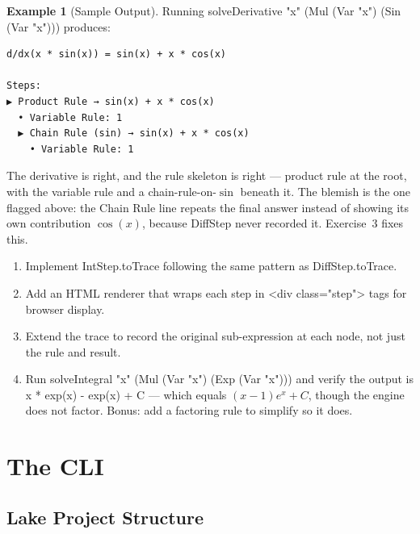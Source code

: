 \documentclass[12pt, openany]{book}
\theoremstyle{plain}
\theoremstyle{definition}
\newtheorem{example}[theorem]{Example}
\theoremstyle{remark}
\newcommand{\li}[1]{{\ttfamily\small\color{tealaccent}#1}}
\begin{document}
\begin{example}[Sample Output]
Running \li{solveDerivative "x" (Mul (Var "x") (Sin (Var "x")))} produces:

\begin{verbatim}
d/dx(x * sin(x)) = sin(x) + x * cos(x)

Steps:
▶ Product Rule → sin(x) + x * cos(x)
  • Variable Rule: 1
  ▶ Chain Rule (sin) → sin(x) + x * cos(x)
    • Variable Rule: 1
\end{verbatim}

The derivative is right, and the rule skeleton is right --- product rule at the root, with the variable rule and a chain-rule-on-$\sin$ beneath it.  The blemish is the one flagged above: the Chain Rule line repeats the final answer instead of showing its own contribution $\cos(x)$, because \li{DiffStep} never recorded it.  Exercise~3 fixes this.
\end{example}

\begin{exbox}
\begin{enumerate}
  \item Implement \li{IntStep.toTrace} following the same pattern as
        \li{DiffStep.toTrace}.
  \item Add an HTML renderer that wraps each step in \li{<div class="step">}
        tags for browser display.
  \item Extend the trace to record the original sub-expression at each node,
        not just the rule and result.
  \item Run \li{solveIntegral "x" (Mul (Var "x") (Exp (Var "x")))} and verify
        the output is \li{x * exp(x) - exp(x) + C} --- which equals
        $(x-1)e^x + C$, though the engine does not factor.  Bonus: add a
        factoring rule to \li{simplify} so it does.
\end{enumerate}
\end{exbox}
\color{black}

\chapter{The CLI}
\color{black}

\section{Lake Project Structure}
\end{document}
